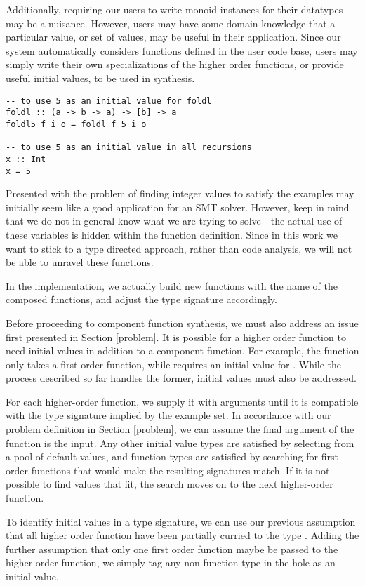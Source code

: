 Additionally, requiring our users to write monoid instances for their datatypes may be a nuisance. However, users may have some domain knowledge that a particular value, or set of values, may be useful in their application. Since our system automatically considers functions defined in the user code base, users may simply write their own specializations of the higher order functions, or provide useful initial values, to be used in synthesis. 

\begin{lstlisting}[caption=adding default initial values]
-- to use 5 as an initial value for foldl
foldl :: (a -> b -> a) -> [b] -> a
foldl5 f i o = foldl f 5 i o

-- to use 5 as an initial value in all recursions
x :: Int
x = 5
\end{lstlisting}

Presented with the problem of finding integer values to satisfy the examples may initially seem like a good application for an SMT solver. However, keep in mind that we do not in general know what we are trying to solve - the actual use of these variables is hidden within the function definition. Since in this work we want to stick to a type directed approach, rather than code analysis, we will not be able to unravel these functions.

In the implementation, we actually build new functions with the name of the composed functions, and adjust the type signature accordingly.

Before proceeding to component function synthesis, we must also address an issue first presented in Section \ref{problem}.
It is possible for a higher order function to need initial values in addition to a component function.
For example, the  function only takes a first order function, while  requires an initial value for .
While the process described so far handles the former, initial values must also be addressed.

For each higher-order function, we supply it with arguments until it is compatible with the type signature implied by the example set. In accordance with our problem definition in Section \ref{problem}, we can assume the final argument of the function is the input. Any other initial value types are satisfied by selecting from a pool of default values, and function types are satisfied by searching for first-order functions that would make the resulting signatures match. If it is not possible to find values that fit, the search moves on to the next higher-order function.

To identify initial values in a type signature, we can use our previous assumption that all higher order function have been partially curried to the type \codeinline{_ -> *-> *}. Adding the further assumption that only one first order function maybe be passed to the higher order function, we simply tag any non-function type in the hole as an initial value.



